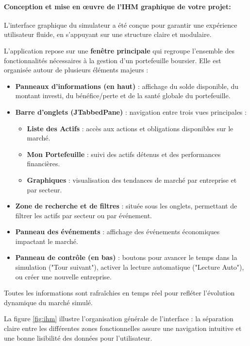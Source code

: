 \paragraph{ Conception et mise en œuvre de l'IHM graphique de votre projet: }


L'interface graphique du simulateur a été conçue pour garantir une expérience utilisateur fluide, en s'appuyant sur une structure claire et modulaire.


L'application repose sur une \textbf{fenêtre principale} qui regroupe l'ensemble des fonctionnalités nécessaires à la gestion d'un portefeuille boursier.  
Elle est organisée autour de plusieurs éléments majeurs :

\begin{itemize}
    \item \textbf{Panneaux d'informations (en haut)} : affichage du solde disponible, du montant investi, du bénéfice/perte et de la santé globale du portefeuille.
    \item \textbf{Barre d'onglets (JTabbedPane)} : navigation entre trois vues principales :
    \begin{itemize}
        \item \textbf{Liste des Actifs} : accès aux actions et obligations disponibles sur le marché.
        \item \textbf{Mon Portefeuille} : suivi des actifs détenus et des performances financières.
        \item \textbf{Graphiques} : visualisation des tendances de marché par entreprise et par secteur.
    \end{itemize}
    \item \textbf{Zone de recherche et de filtres} : située sous les onglets, permettant de filtrer les actifs par secteur ou par événement.
    \item \textbf{Panneau des événements} : affichage des événements économiques impactant le marché.
    \item \textbf{Panneau de contrôle (en bas)} : boutons pour avancer le temps dans la simulation ("Tour suivant"), activer la lecture automatique ("Lecture Auto"), ou créer une nouvelle entreprise.
\end{itemize}

Toutes les informations sont rafraîchies en temps réel pour refléter l'évolution dynamique du marché simulé.


La figure \ref{fig:ihm} illustre l'organisation générale de l'interface :  
la séparation claire entre les différentes zones fonctionnelles assure une navigation intuitive et une bonne lisibilité des données pour l'utilisateur.


